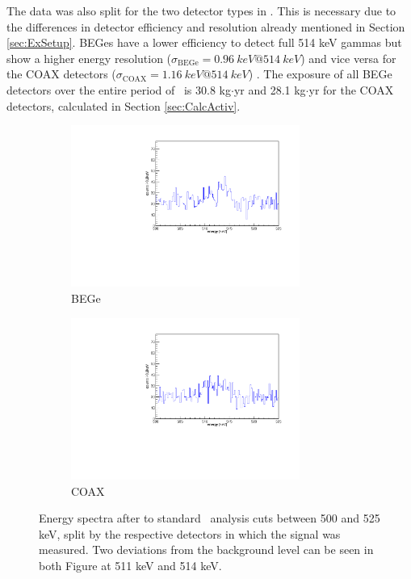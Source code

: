 \documentclass[encoding=utf8,british]{tumphthesis}
\begin{document}
The data was also split for the two detector types in \gerda.
This is necessary due to the differences in detector efficiency and resolution already mentioned in Section \ref{sec:ExSetup}.
BEGes have a lower efficiency to detect full 514 keV gammas but show a higher energy resolution ($\sigma_{\mathrm{BEGe}} = 0.96~\unit{keV}  @ 514 ~\unit{keV}$) and vice versa for the COAX detectors ($\sigma_{\mathrm{COAX}} = 1.16~\unit{keV} @ 514 ~\unit{keV}$) \cite{agostini_background_2017}.
The exposure of all BEGe detectors over the entire period of \PII\ is 30.8 kg$\cdot$yr and 28.1 kg$\cdot$yr for the COAX detectors, calculated in Section \ref{sec:CalcActiv}.
\\ %

\begin{figure}[t!]
\centering
\begin{subfigure}{.475\textwidth}
  \centering
	\includegraphics[width=75mm]{./Bilder/500525NoFilterBEGes.pdf}

  \caption{BEGe}
    \label{fig:NoFilterBEGes}
\end{subfigure}\hfill%
\begin{subfigure}{.475\textwidth}
  \centering
	\includegraphics[width=75mm]{./Bilder/500525NoFilterCOAX.pdf}
  \caption{COAX}
  \label{fig:NoFilterCOAX}
\end{subfigure}
	\caption{
	Energy spectra after to standard \gerda\ analysis cuts between 500 and 525 keV, split by the respective detectors in which the signal was measured.
	Two deviations from the background level can be seen in both Figure at 511 keV and 514 keV.
	}
\end{figure}
\end{document}
